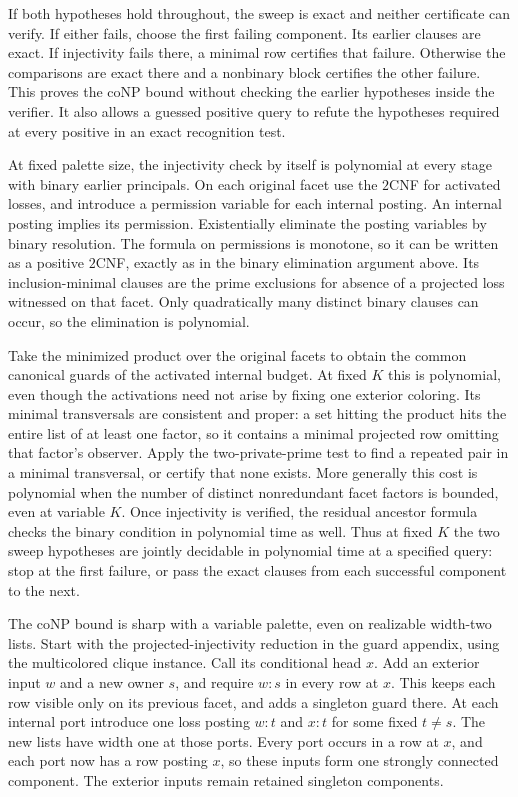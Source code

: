 If both hypotheses hold throughout, the sweep
is exact and neither certificate can verify.
If either fails, choose the first failing
component. Its earlier clauses are exact. If
injectivity fails there, a minimal row certifies
that failure. Otherwise the comparisons are
exact there and a nonbinary block certifies the
other failure. This proves the coNP bound
without checking the earlier hypotheses inside
the verifier. It also allows a guessed positive
query to refute the hypotheses required at every
positive in an exact recognition test.

At fixed palette size, the injectivity check by
itself is polynomial at every stage with binary
earlier principals. On each original facet use the
$2$CNF for activated losses, and introduce a
permission variable for each internal posting.
An internal posting implies its permission.
Existentially eliminate the posting variables by
binary resolution. The formula on permissions
is monotone, so it can be written as a positive
$2$CNF, exactly as in the binary elimination
argument above. Its inclusion-minimal clauses
are the prime exclusions for absence of a
projected loss witnessed on that facet. Only
quadratically many distinct binary clauses can
occur, so the elimination is polynomial.

Take the minimized product over the original
facets to obtain the common canonical guards of
the activated internal budget. At fixed $K$
this is polynomial, even though the activations
need not arise by fixing one exterior coloring.
Its minimal transversals are consistent and
proper: a set hitting the product hits the
entire list of at least one factor, so it
contains a minimal projected row omitting that
factor's observer. Apply the two-private-prime
test to find a repeated pair in a minimal
transversal, or certify that none exists.
More generally this cost is polynomial when
the number of distinct nonredundant facet
factors is bounded, even at variable $K$.
Once injectivity is verified, the residual
ancestor formula checks the binary condition
in polynomial time as well. Thus at fixed $K$
the two sweep hypotheses are jointly decidable
in polynomial time at a specified query: stop
at the first failure, or pass the exact clauses
from each successful component to the next.

The coNP bound is sharp with a variable palette,
even on realizable width-two lists. Start with the
projected-injectivity reduction in the guard appendix,
using the multicolored clique instance. Call its
conditional head $x$. Add an exterior input $w$ and
a new owner $s$, and require $w{:}s$ in every row at
$x$. This keeps each row visible only on its previous
facet, and adds a singleton guard there. At each
internal port introduce one loss posting $w{:}t$ and
$x{:}t$ for some fixed $t\ne s$. The new lists have
width one at those ports. Every port occurs in a row
at $x$, and each port now has a row posting $x$, so
these inputs form one strongly connected component.
The exterior inputs remain retained singleton
components.

